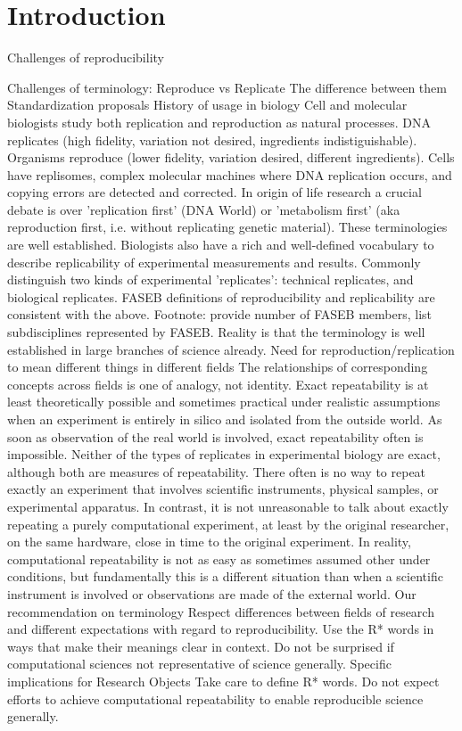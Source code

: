 \section{Introduction}

Challenges of reproducibility

	Challenges of terminology: Reproduce vs Replicate
		The difference between them
		Standardization proposals
		History of usage in biology
			Cell and molecular biologists study both replication and reproduction as natural processes.
			DNA replicates (high fidelity, variation not desired, ingredients indistiguishable).
			Organisms reproduce (lower fidelity, variation desired, different ingredients).
			Cells have replisomes, complex molecular machines where DNA replication occurs, and copying errors are detected and corrected.
			In origin of life research a crucial debate is over 'replication first' (DNA World) or 
 					'metabolism first' (aka reproduction first, i.e. without replicating genetic material).
			These terminologies are well established.
			Biologists also have a rich and well-defined vocabulary to describe replicability of experimental measurements and results.
			Commonly distinguish two kinds of experimental 'replicates':  technical replicates, and biological replicates.
			FASEB definitions of reproducibility and replicability are consistent with the above.
			Footnote: provide number of FASEB members, list subdisciplines represented by FASEB.
 				Reality is that the terminology is well established in large branches of science already.
		Need for reproduction/replication to mean different things in different fields
			The relationships of corresponding concepts across fields is one of analogy, not identity.
			Exact repeatability is at least theoretically possible and sometimes practical under realistic assumptions when an experiment 
				is entirely in silico and isolated from the outside world.
			As soon as observation of the real world is involved, exact repeatability often is impossible.
			Neither of the types of replicates in experimental biology are exact, although both are measures of repeatability.
			There often is no way to repeat exactly an experiment that involves scientific instruments, physical samples, or experimental apparatus.
			In contrast, it is not unreasonable to talk about exactly repeating a purely computational experiment, at least by the original researcher,
				on the same hardware, close in time to the original experiment.
			In reality, computational repeatability is not as easy as sometimes assumed other under conditions, but fundamentally this is
				a different situation than when a scientific instrument is involved or observations are made of the external world.
		Our recommendation on terminology
			Respect differences between fields of research and different expectations with regard to reproducibility.
			Use the R* words in ways that make their meanings clear in context.
			Do not be surprised if computational sciences not representative of science generally.
		Specific implications for Research Objects
			Take care to define R* words.
			Do not expect efforts to achieve computational repeatability to enable reproducible science generally.

